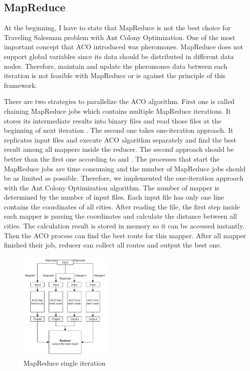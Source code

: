 \documentclass[11pt, letterpaper]{article}
\begin{document}
	\subsection{MapReduce}
	At the beginning, I have to state that MapReduce is not the best choice for Traveling Salesman problem with Ant Colony Optimization. One of the most important concept that ACO introduced was pheromones. MapReduce does not support global variables since its data should be distributed in different data nodes. Therefore, maintain and update the pheromones data between each iteration is not feasible with MapReduce or is against the principle of this framework. \par
	There are two strategies to parallelize the ACO algorithm. First one is called chaining MapReduce jobs which contains multiple MapReduce iterations. It stores its intermediate results into binary files and read those files at the beginning of next iteration \cite{amo}. The second one takes one-iteration approach. It replicates input files and execute ACO algorithm separately and find the best result among all mappers inside the reducer. The second approach should be better than the first one according to \cite{bwu} and \cite{gc}. The processes that start the MapReduce jobs are time consuming and the number of MapReduce jobs should be as limited as possible. Therefore, we implemented the one-iteration approach with the Ant Colony Optimization algorithm. The number of mapper is determined by the number of input files. Each input file has only one line contains the coordinates of all cities. After reading the file, the first step inside each mapper is parsing the coordinates and calculate the distance between all cities. The calculation result is stored in memory so it can be accessed instantly. Then the ACO process can find the best route for this mapper. After all mapper finished their job, reducer can collect all routes and output the best one.
	\begin{figure}[H]
		\centering
		\includegraphics[width=0.4\textwidth]{mapPa}
		\caption{MapReduce single iteration}
	\end{figure}
	
\end{document}
